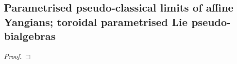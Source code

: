    \subsection{Parametrised pseudo-classical limits of affine Yangians; toroidal parametrised Lie pseudo-bialgebras}
        \begin{definition} \label{def: parametrised_pseudo_quantisations}
            
        \end{definition}
        \begin{theorem} \label{theorem: parametrised_pseudo_classical_limits_of_affine_yangians}
            
        \end{theorem}
            \begin{proof}
                
            \end{proof}
